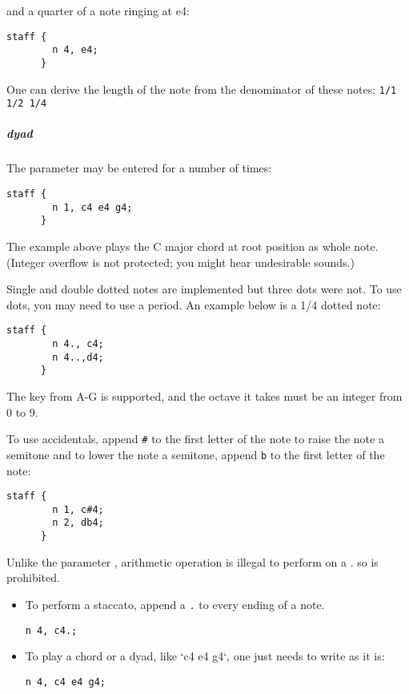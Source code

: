 and a quarter of a note ringing at e4:
\begin{Verbatim}[frame=single]
      staff {
        n 4, e4;
      }
\end{Verbatim}

\np One can derive the length of the note from the denominator of these notes:
\verb+1/1 1/2 1/4+

\subparagraph{dyad}
The parameter  may be entered for a number of times:

\begin{Verbatim}[frame=single]
      staff {
        n 1, c4 e4 g4;
      }
\end{Verbatim}

\np The example above plays the C major chord at root position as whole note. (Integer overflow is not
protected; you might hear undesirable sounds.)

\np Single and double dotted notes are implemented but three dots were not. To use dots, you may need to use a period. An example below is a 1/4 dotted note:
\begin{Verbatim}[frame=single]
      staff {
        n 4., c4;
        n 4..,d4;
      }
\end{Verbatim}

\np The key from A-G is supported, and the octave it takes must be an integer
from 0 to 9.

\np To use accidentals, append \verb+#+ to the first letter of the note to raise the note a semitone and to lower the
note a semitone, append \verb+b+ to the first letter of the note:
\begin{Verbatim}[frame=single]
      staff {
        n 1, c#4;
        n 2, db4;
      }
\end{Verbatim}

\np Unlike the parameter , arithmetic operation is illegal
to perform on a . so  is prohibited.

\begin{itemize}
\item To perform a staccato, append a \verb+.+ to every ending of a note.

\begin{Verbatim}[frame=single]
      n 4, c4.;
\end{Verbatim}

\item To play a chord or a dyad, like `c4 e4 g4`, one just needs to write as it is:

\begin{Verbatim}[frame=single]
      n 4, c4 e4 g4;
\end{Verbatim}
\end{itemize}

